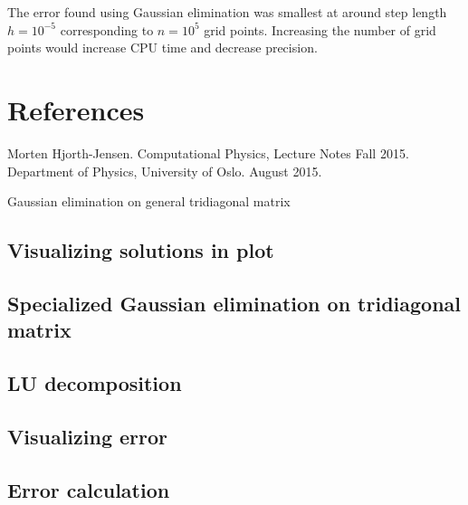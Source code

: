 \documentclass[norsk,a4paper,12pt]{article}
\begin{document}
The error found using Gaussian elimination was smallest at around step length $h=10^{-5}$ corresponding to $n=10^5$ grid points. Increasing the number of grid points would increase CPU time and decrease precision.
\section{References}
\begingroup
\renewcommand{\section}[2]{}
\begin{thebibliography}{}
  Morten Hjorth-Jensen.
  Computational Physics, Lecture Notes Fall 2015.
  Department of Physics, University of Oslo.
  August 2015.

\end{thebibliography}
\endgroup
\section{Code attachment}
\subsection{Gaussian elimination on general tridiagonal matrix}
\label{subsec:Gausgen}

\subsection{Visualizing solutions in plot}
\label{subsec:Visual}

\subsection{Specialized Gaussian elimination on tridiagonal matrix}
\label{subsec:Gausspes}

\subsection{LU decomposition}
\label{subsec:LUdecomp}

\subsection{Visualizing error}
\label{subsec:errorvis}

\subsection{Error calculation}
\label{subsec:errorcalc}

\end{document}
